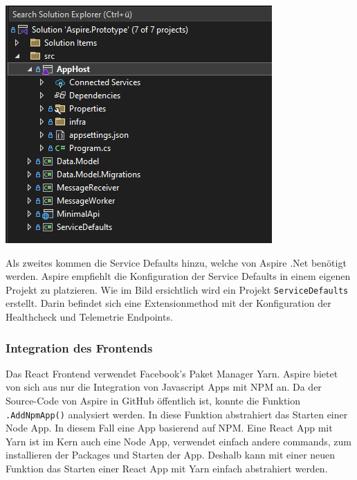             \includegraphics[scale=1]{Ressources/Bilder/Porjektstruktur.AppHost.png}\par

            Als zweites kommen die Service Defaults hinzu, welche von Aspire .Net benötigt werden. Aspire empfiehlt die Konfiguration der Service Defaults in einem eigenen Projekt zu platzieren. Wie im Bild ersichtlich wird ein Projekt \verb|ServiceDefaults| erstellt. Darin befindet sich eine Extensionmethod mit der Konfiguration der Healthcheck und Telemetrie Endpoints.

        \subsubsection{Integration des Frontends}

            Das React Frontend verwendet Facebook's Paket Manager Yarn. Aspire bietet von sich aus nur die Integration von Javascript Apps mit NPM an. Da der Source-Code von Aspire in GitHub öffentlich ist, konnte die Funktion \verb|.AddNpmApp()| analysiert werden. In diese Funktion abstrahiert das Starten einer Node App. In diesem Fall eine App basierend auf NPM. Eine React App mit Yarn ist im Kern auch eine Node App, verwendet einfach andere commands, zum installieren der Packages und Starten der App. Deshalb kann mit einer neuen Funktion das Starten einer React App mit Yarn einfach abstrahiert werden.


